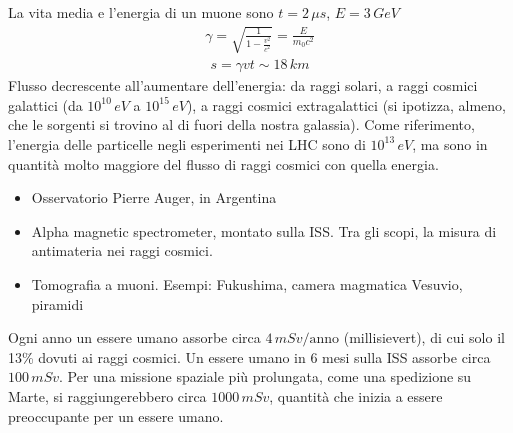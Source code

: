 \documentclass[letterpaper,10pt,italian]{jupyterBook}
\begin{document}
\sphinxAtStartPar
{} La vita media e l’energia di un muone sono \(t = 2 \, \mu s\), \(E = 3 \, GeV\)
\begin{equation*}
\begin{split}\gamma = \sqrt{\frac{1}{1-\frac{v^2}{c^2}}} = \frac{E}{m_0 c^2}\end{split}
\end{equation*}\begin{equation*}
\begin{split}s = \gamma v t \sim 18 \, km\end{split}
\end{equation*}
\sphinxAtStartPar
{} Flusso decrescente all’aumentare dell’energia: da raggi solari, a raggi cosmici galattici (da \(10^{10} \, eV\) a \(10^{15} \, eV\)), a raggi cosmici extra\sphinxhyphen{}galattici (si ipotizza, almeno, che le sorgenti si trovino al di fuori della nostra galassia). Come riferimento, l’energia delle particelle negli esperimenti nei LHC sono di \(10^{13} \, eV\), ma sono in quantità molto maggiore del flusso di raggi cosmici con quella energia.

\sphinxAtStartPar
{}
\begin{itemize}
\item {} 
\sphinxAtStartPar
Osservatorio Pierre Auger, in Argentina

\item {} 
\sphinxAtStartPar
Alpha magnetic spectrometer, montato sulla ISS. Tra gli scopi, la misura di antimateria nei raggi cosmici.

\end{itemize}

\sphinxAtStartPar
{}
\begin{itemize}
\item {} 
\sphinxAtStartPar
Tomografia a muoni. Esempi: Fukushima, camera magmatica Vesuvio, piramidi

\end{itemize}

\sphinxAtStartPar
{} Ogni anno un essere umano assorbe circa \(4 \, m Sv / \text{anno}\) (milli\sphinxhyphen{}sievert), di cui solo il 13\% dovuti ai raggi cosmici. Un essere umano in 6 mesi sulla ISS assorbe circa \(100 \, m Sv\). Per una missione spaziale più prolungata, come una spedizione su Marte, si raggiungerebbero circa \(1000 \, m Sv\), quantità che inizia a essere preoccupante per un essere umano.
\end{document}
